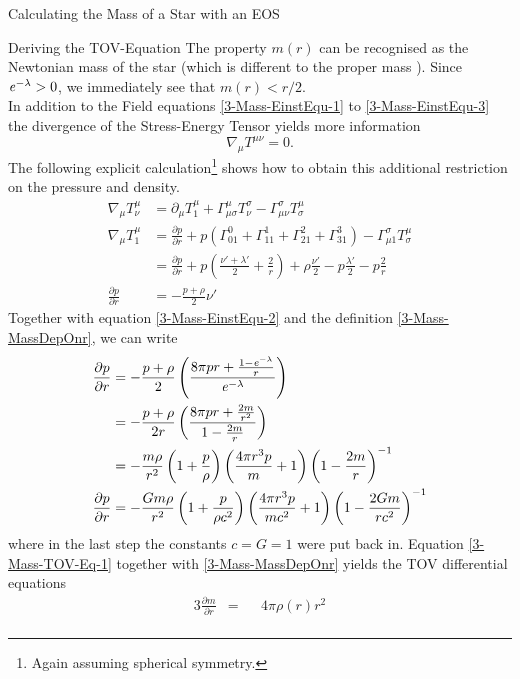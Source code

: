\begin{section}{Calculating the Mass of a Star with an EOS}
\begin{subsection}{Deriving the TOV-Equation}
The property $m(r)$ can be recognised as the Newtonian mass of the star (which is different to the proper mass \cite{waldGeneralRelativity1984}). Since $\mathit{e}^{-\lambda}>0$, we immediately see that $m(r)<r/2$.\\
In addition to the Field equations \eqref{3-Mass-EinstEqu-1} to \eqref{3-Mass-EinstEqu-3} the divergence of the Stress-Energy Tensor yields more information
\begin{equation}
	\nabla_\mu T^{\mu\nu}=0.
\end{equation}
The following explicit calculation\footnote{Again assuming spherical symmetry.} shows how to obtain this additional restriction on the pressure and density.
\begin{align}
	\nabla_\mu T^\mu_\nu 	&= \partial_\mu T^\mu_1 + \Gamma^\mu_{\mu\sigma}T^\sigma_\nu-\Gamma^\sigma_{\mu\nu}T^\mu_\sigma\\
	\nabla_\mu T^\mu_1		&= \frac{\partial p}{\partial r} + p\left(\Gamma^0_{01}+\Gamma^1_{11}+\Gamma^2_{21}+\Gamma^3_{31} \right) - \Gamma^\sigma_{\mu 1}T^\mu_\sigma\\
							&= \frac{\partial p}{\partial r} + p\left(\frac{\nu'+\lambda'}{2} + \frac{2}{r}\right) + \rho\frac{\nu'}{2} - p\frac{\lambda'}{2} - p\frac{2}{r}\\
	\frac{\partial p}{\partial r} &= -\frac{p+\rho}{2}\nu'
\end{align}
Together with equation \eqref{3-Mass-EinstEqu-2} and the definition \eqref{3-Mass-MassDepOnr}, we can write
\begin{align}
	\frac{\partial p}{\partial r} 	&= -\frac{p+\rho}{2}\left(\frac{8\pi pr + \frac{1-\mathit{e}^{-\lambda}}{r}}{\mathit{e}^{-\lambda}} \right)\\
									&= -\frac{p+\rho}{2r}\left(\frac{8\pi pr+ \frac{2m}{r^2}}{1-\frac{2m}{r}} \right)\\
									&= -\frac{m\rho}{r^2}\left(1+\frac{p}{\rho}\right)\left(\frac{4\pi r^3p}{m}+1\right)\left(1-\frac{2m}{r}\right)^{-1}\\
	\frac{\partial p}{\partial r} 	&= -\frac{Gm\rho}{r^2}\left(1+\frac{p}{\rho c^2}\right)\left(\frac{4\pi r^3p}{mc^2}+1\right)\left(1-\frac{2Gm}{rc^2}\right)^{-1}
	\label{3-Mass-TOV-Eq-1}
\end{align}
where in the last step the constants $c=G=1$ were put back in. Equation \eqref{3-Mass-TOV-Eq-1} together with \eqref{3-Mass-MassDepOnr} yields the \ac{TOV} differential equations
\begin{alignat}{3}
	\frac{\partial m}{\partial r} &= &&4\pi\rho(r)r^2\\

\end{alignat}
\end{subsection}
\end{section}
